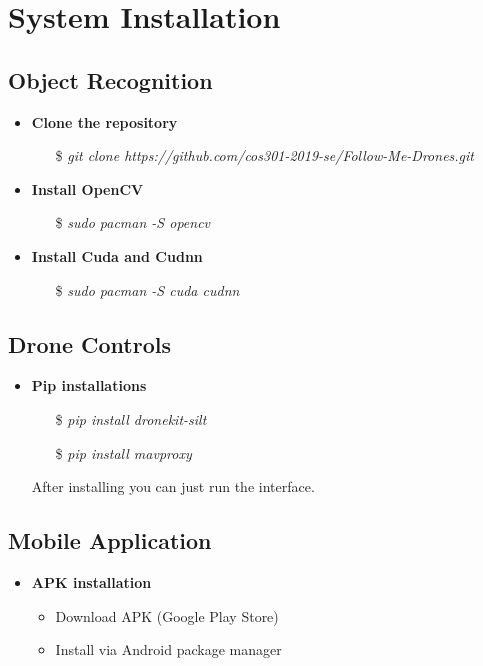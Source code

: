 \chapter{System Installation}

\section{Object Recognition}
\begin{itemize}
    \item \textbf{Clone the repository}
        \begin{itemize}
            \item[\$] \textit{git clone https://github.com/cos301-2019-se/Follow-Me-Drones.git}
        \end{itemize}
    \item \textbf{Install OpenCV}
        \begin{itemize}
            \item[\$] \textit{sudo pacman -S opencv}
        \end{itemize}
    \item \textbf{Install Cuda and Cudnn}
        \begin{itemize}
            \item[\$] \textit{sudo pacman -S cuda cudnn}
        \end{itemize}
\end{itemize}

\section{Drone Controls}

\begin{itemize}
    \item \textbf{Pip installations}
        \begin{itemize}
            \item[\$] \textit{pip install dronekit-silt}
            \item[\$] \textit{pip install mavproxy} 
        \end{itemize}
        After installing you can just run the interface.
\end{itemize}

\section{Mobile Application}

\begin{itemize}
	\item \textbf{APK installation}
        \begin{itemize}
			\item  Download APK (Google Play Store) 
			\item  Install via Android package manager 
        \end{itemize}
\end{itemize}
